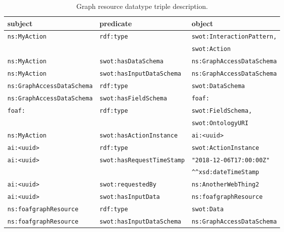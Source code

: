 \begin{table*}[t]
\centering
\footnotesize
\caption{Graph resource datatype triple description.}
\label{tab:graph_resource_datatype}
\begin{tabular}{lll}
\textbf{subject}           & \textbf{predicate}           & \textbf{object}           \\ \hline
\texttt{ns:MyAction}       & \texttt{rdf:type}            & \texttt{swot:InteractionPattern,}  \\
       &          & \texttt{swot:Action}  \\ \hline
\texttt{ns:MyAction}       & \texttt{swot:hasDataSchema}   & \texttt{ns:GraphAccessDataSchema} \\ \hline
\texttt{ns:MyAction}       & \texttt{swot:hasInputDataSchema} & \texttt{ns:GraphAccessDataSchema}  \\ \hline
\texttt{ns:GraphAccessDataSchema} & \texttt{rdf:type}            & \texttt{swot:DataSchema}   \\ \hline
\texttt{ns:GraphAccessDataSchema} & \texttt{swot:hasFieldSchema}  & \texttt{foaf:} \\ \hline
\texttt{foaf:} & \texttt{rdf:type}        & \texttt{swot:FieldSchema,}\\ 
&     & \texttt{swot:OntologyURI}\\ \hline

\rowcolor{lightgray}
\texttt{ns:MyAction}       & \texttt{swot:hasActionInstance}   & \texttt{ai:<uuid>}   \\ \hline
\rowcolor{lightgray}
\texttt{ai:<uuid>}       & \texttt{rdf:type} & \texttt{swot:ActionInstance} \\ \hline
\rowcolor{lightgray}
\texttt{ai:<uuid>} & \texttt{swot:hasRequestTimeStamp}      & \texttt{"2018-12-06T17:00:00Z"}     \\
\rowcolor{lightgray}
 &       & \texttt{\textasciicircum \textasciicircum xsd:dateTimeStamp}     \\ \hline
\rowcolor{lightgray}
\texttt{ai:<uuid>} & \texttt{swot:requestedBy} & \texttt{ns:AnotherWebThing2} \\ \hline
\rowcolor{lightgray}
\texttt{ai:<uuid>} & \texttt{swot:hasInputData}   & \texttt{ns:foafgraphResource} \\ \hline
\rowcolor{lightgray}
\texttt{ns:foafgraphResource} & \texttt{rdf:type}   & \texttt{swot:Data} \\ \hline
\rowcolor{lightgray}
\texttt{ns:foafgraphResource} & \texttt{swot:hasInputDataSchema}   & \texttt{ns:GraphAccessDataSchema} \\ \hline
\end{tabular}
\end{table*}

